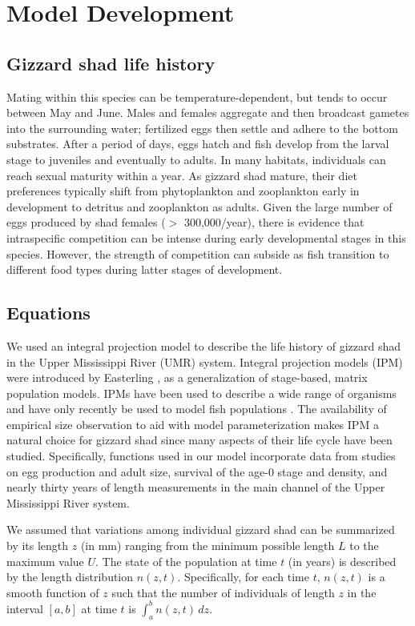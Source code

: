 \documentclass[preprint,review,12pt,authoryear]{elsarticle}
\def\ds{\displaystyle}
\begin{document}
\section{Model Development}
\subsection{Gizzard shad life history}
Mating within this species can be temperature-dependent, but tends to occur between May and June. 
Males and females aggregate and then broadcast gametes into the surrounding water; fertilized eggs then settle and adhere to the bottom substrates. 
After a period of days, eggs hatch and fish develop from the larval stage to juveniles and eventually to adults. 
In many habitats, individuals can reach sexual maturity within a year. 
As gizzard shad mature, their diet preferences typically shift from phytoplankton and zooplankton early in development to detritus and zooplankton as adults. 
Given the large number of eggs produced by shad females ($>$ 300,000/year), there is evidence that intraspecific competition can be intense during early developmental stages in this species. 
However, the strength of competition can subside as fish transition to different food types during latter stages of development.   

\subsection{Equations}
We used an integral projection model to describe the life history of gizzard shad in the Upper Mississippi River (UMR) system. 
Integral projection models (IPM) were introduced by Easterling \citep{easterling2000size}, as a generalization of stage-based, matrix population models. 
IPMs have been used to describe a wide range of organisms \citep{ellner2016data, merow2014advancing, rees2014building} and have only recently be used to model fish populations \citep{erickson2017integral, liao2019dynamic, white2016fitting, pollesch2022developing}.
The availability of empirical size observation to aid with model parameterization makes IPM a natural choice for gizzard shad since many aspects of their life cycle have been studied. 
Specifically, functions used in our model incorporate data from studies on egg production and adult size,  survival of the age-0 stage and density, and nearly thirty years of length measurements in the main channel of the Upper Mississippi River system.

We assumed that variations among individual gizzard shad can be summarized by its length $z$ (in mm) ranging from the minimum possible length $L$ to the maximum value $U$. 
The state of the population at time $t$ (in years) is described by the length distribution $n(z,t)$. 
Specifically, for each time $t$, $n(z,t)$ is a smooth function of $z$ such that the number of individuals of length $z$ in the interval $[a,b]$ at time $t$ is $\ds \int_a^b n(z,t) \, dz$. 
\end{document}
